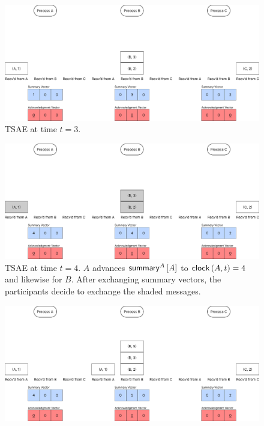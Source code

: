 \documentclass[]             %
{NASA}                       %
\theoremstyle{definition}
\begin{document}
\begin{landscape}
  \begin{figure}[h]%
  \end{figure}
  \begin{figure}[h]
    \centering
    \includegraphics[width=1.4\textwidth]{images/tsae/TSAE3.png}
    \caption{TSAE at time $t=3$.}
    \label{fig:tsae1}
  \end{figure}
  \begin{figure}[h]
    \centering
    \includegraphics[width=1.4\textwidth]{images/tsae/TSAE4.png}
    \caption{TSAE at time $t=4$. $A$ advances $\mathsf{summary}^{A}\left[A\right]$ to $\mathsf{clock}\left(A, t\right) = 4$ and likewise for $B$. After exchanging summary vectors, the participants decide to exchange the shaded messages.}
    \label{fig:tsae2}
  \end{figure}
  \begin{figure}[h]
    \centering
    \includegraphics[width=1.4\textwidth]{images/tsae/TSAE5.png}

\end{figure}
\end{landscape}
\end{document}
